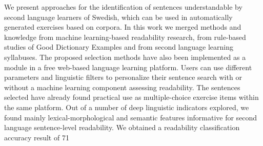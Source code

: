 We present approaches for the identification of sentences understandable by second language learners of Swedish, which can be used in automatically generated exercises based on corpora. In this work we merged methods and knowledge from machine learning-based readability research, from rule-based studies of Good Dictionary Examples and from second language learning syllabuses. The proposed selection methods have also been implemented as a module in a free web-based language learning platform. Users can use different parameters and linguistic filters to personalize their sentence search with or without a machine learning component assessing readability. The sentences selected have already found practical use as multiple-choice exercise items within the same platform. Out of a number of deep linguistic indicators explored, we found mainly lexical-morphological and semantic features informative for second language sentence-level readability. We obtained a readability classification accuracy result of 71\\%
